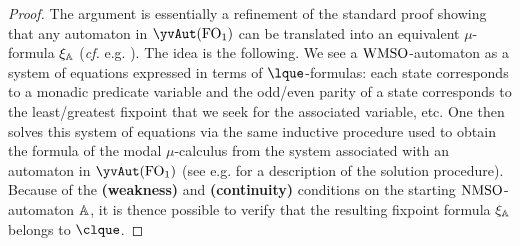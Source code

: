 \begin{proof} The argument is
 essentially a refinement of the standard proof showing that any automaton in $\yvAut(\ofo)$ can be translated into an equivalent $\mu$-formula
$\xi_\mathbb{A}$ (\emph{cf.} e.g. \cite{Ven08}).
The idea is the following. We see a $\mathrm{WMSO}$-automaton as a system of equations expressed in terms of $\lque$-formulas: each state corresponds to a monadic predicate variable and the odd/even parity of a state corresponds to the least/greatest fixpoint that we seek for the associated variable, etc. One then solves this system of equations via the same inductive procedure used to obtain the formula of the modal $\mu$-calculus from the system associated with an automaton in $\yvAut(\ofo)$ (see e.g. \cite{ArnoldN01} for a description of the solution procedure). Because of the \textbf{(weakness)} and \textbf{(continuity)} conditions on the starting $\mathrm{NMSO}$-automaton $\mathbb{A}$, it is thence possible to verify that the resulting fixpoint formula $\xi_\mathbb{A}$ belongs to $\clque$.
%
\end{proof}
